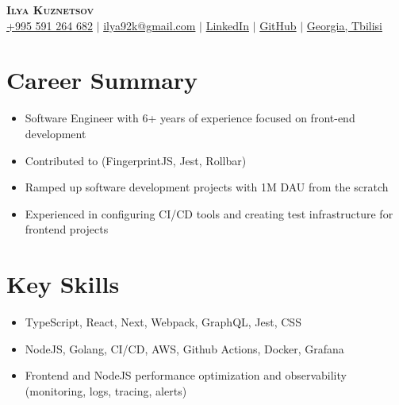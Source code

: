 \documentclass[letterpaper,11pt]{article}
\newcommand{\resumeItem}[1]{
  \item\small{
    {#1 \vspace{-2pt}}
  }
}
\newcommand{\resumeItemListStart}{\begin{itemize}}
\newcommand{\resumeItemListEnd}{\end{itemize}\vspace{-5pt}}
\begin{document}

\begin{center}
    \textbf{\Huge \scshape Ilya Kuznetsov} \\ \vspace{3pt}
    \small
    \faMobile \hspace{.5pt} \href{tel:995591264682}{+995 591 264 682}
    $|$
    \faAt \hspace{.5pt} \href{mailto:ilya92k@gmail.com}{ilya92k@gmail.com}
    $|$
    \faLinkedinSquare \hspace{.5pt} \href{https://www.linkedin.com/in/ilya-kuznetsov-frontend}{LinkedIn}
    $|$
    \faGithub \hspace{.5pt} \href{https://github.com/dj-stormtrooper}{GitHub}
    $|$
    \faMapMarker \hspace{.5pt} \href{https://goo.gl/maps/DxtDYXA3ihT92Ffm6}{Georgia, Tbilisi}
\end{center}



\section{Career Summary}
  \vspace{3pt}
  \resumeItemListStart
    \resumeItem{Software Engineer with 6+ years of experience focused on front-end development}
    \resumeItem{Contributed to (FingerprintJS, Jest, Rollbar)}
    \resumeItem{Ramped up software development projects with 1M DAU from the scratch}
    \resumeItem{Experienced in configuring CI/CD tools and creating test infrastructure for frontend projects}
  \resumeItemListEnd


\section{Key Skills}
\vspace{3pt}
\resumeItemListStart
  \resumeItem{TypeScript, React, Next, Webpack, GraphQL, Jest, CSS}
  \resumeItem{NodeJS, Golang, CI/CD, AWS, Github Actions, Docker, Grafana}
  \resumeItem{Frontend and NodeJS performance optimization and observability (monitoring, logs, tracing, alerts)}
\resumeItemListEnd

\end{document}

